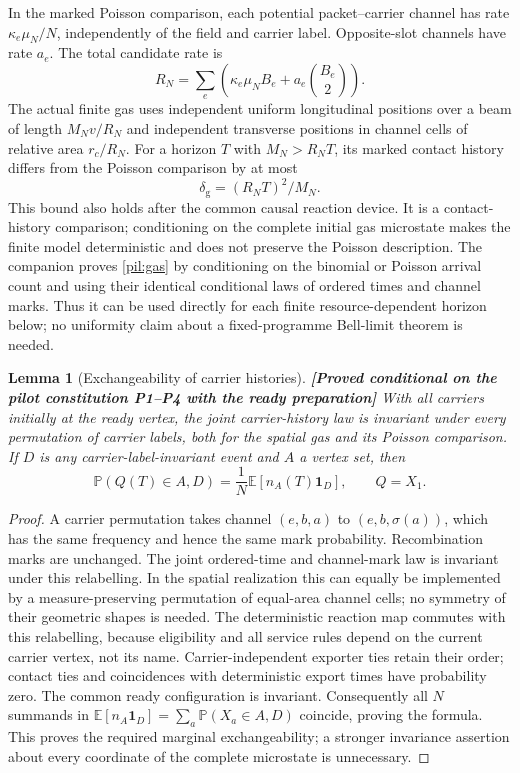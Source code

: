 \documentclass[11pt,a4paper]{article}
\newtheorem{lemma}[theorem]{Lemma}
\theoremstyle{definition}
\theoremstyle{remark}\newtheorem{remark}[theorem]{Remark}
\newcommand{\status}[1]{\textbf{[#1]}\quad}
\begin{document}
In the marked Poisson comparison, each potential packet--carrier channel has rate $\kappa_e\mu_N/N$, independently of the field and carrier label. Opposite-slot channels have rate $a_e$. The total candidate rate is
\begin{equation}\label{pil:candidate}
 R_N=\sum_e\left(\kappa_e\mu_N B_e+a_e\binom{B_e}{2}\right).
\end{equation}
The actual finite gas uses independent uniform longitudinal positions over a beam of length $M_Nv/R_N$ and independent transverse positions in channel cells of relative area $r_c/R_N$. For a horizon $T$ with $M_N>R_NT$, its marked contact history differs from the Poisson comparison by at most
\begin{equation}\label{pil:gas}
 \delta_{\mathrm g}=(R_NT)^2/M_N.
\end{equation}
This bound also holds after the common causal reaction device. It is a contact-history comparison; conditioning on the complete initial gas microstate makes the finite model deterministic and does not preserve the Poisson description. The companion proves \eqref{pil:gas} by conditioning on the binomial or Poisson arrival count and using their identical conditional laws of ordered times and channel marks. Thus it can be used directly for each finite resource-dependent horizon below; no uniformity claim about a fixed-programme Bell-limit theorem is needed.

\begin{lemma}[Exchangeability of carrier histories]\label{pil:exchange}
\status{Proved conditional on the pilot constitution P1--P4 with the ready preparation}
With all carriers initially at the ready vertex, the joint carrier-history law is invariant under every permutation of carrier labels, both for the spatial gas and its Poisson comparison. If $D$ is any carrier-label-invariant event and $A$ a vertex set, then
\begin{equation}\label{pil:exchangeformula}
 \mathbb P(Q(T)\in A,D)=\frac1N\mathbb E[n_A(T)\mathbf1_D],\qquad Q=X_1.
\end{equation}
\end{lemma}
\begin{proof}
A carrier permutation takes channel $(e,b,a)$ to $(e,b,\sigma(a))$, which has the same frequency and hence the same mark probability. Recombination marks are unchanged. The joint ordered-time and channel-mark law is invariant under this relabelling. In the spatial realization this can equally be implemented by a measure-preserving permutation of equal-area channel cells; no symmetry of their geometric shapes is needed. The deterministic reaction map commutes with this relabelling, because eligibility and all service rules depend on the current carrier vertex, not its name. Carrier-independent exporter ties retain their order; contact ties and coincidences with deterministic export times have probability zero. The common ready configuration is invariant. Consequently all $N$ summands in $\mathbb E[n_A\mathbf1_D]=\sum_a\mathbb P(X_a\in A,D)$ coincide, proving the formula. This proves the required marginal exchangeability; a stronger invariance assertion about every coordinate of the complete microstate is unnecessary.
\end{proof}
\end{document}
